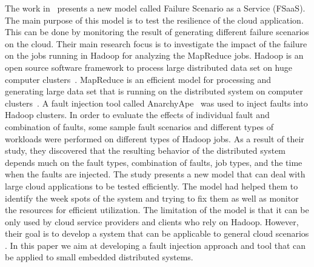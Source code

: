 The work in~\cite{FaaS} presents a new model called Failure Scenario as a Service (FSaaS). The main purpose of this model is to test the resilience of the cloud application. This can be done by monitoring the result of generating different failure scenarios on the cloud. Their main research focus is to investigate the impact of the failure on the jobs running in Hadoop for analyzing the MapReduce jobs. Hadoop is an open source software framework %
to process large distributed data set on huge computer clusters~\cite{hadoop}. MapReduce is an efficient model for processing and generating large data set that is running on the distributed system on computer clusters~\cite{mapreduce}.    
A fault injection tool called AnarchyApe~\cite{AnarchyApe} was used to inject faults into Hadoop clusters. In order to evaluate the effects of individual fault and combination of faults, some sample fault scenarios and different types of workloads were performed on different types of Hadoop jobs. As a result of their study, they discovered that the resulting behavior of the distributed system depends much on the fault types, combination of faults, job types, and the time when the faults are injected. %
The study presents a new model that can deal with large cloud applications to be tested efficiently. 
The model had helped them to identify the week spots of the system and trying to fix them as well as monitor the resources for efficient utilization.
The limitation of the model is that it can be only used by cloud service providers and clients who rely on Hadoop. However, their goal is to develop a system that can be applicable to general cloud scenarios \cite{FaaS}. In this paper we aim at developing a fault injection approach and tool that can be applied to small embedded distributed systems. %
 
